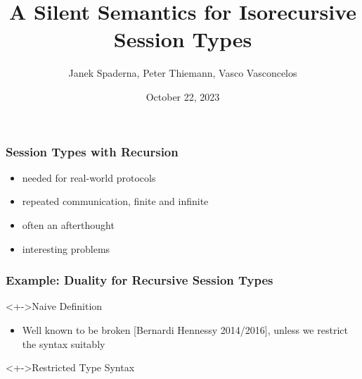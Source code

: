 \documentclass[aspectratio=169]{beamer}
\title{A Silent Semantics for Isorecursive Session Types}
\author{Janek Spaderna, Peter Thiemann, Vasco Vasconcelos}
\institute[]{University of Freiburg, University of Lisbon}
\date{October 22, 2023}
\begin{document}

\begin{frame}
  \titlepage
\end{frame}


\begin{frame}
  \frametitle{Session Types with Recursion}
  \begin{itemize}
  \item needed for real-world protocols
  \item repeated communication, finite and infinite
  \item often an afterthought
  \item interesting problems
  \end{itemize}
\end{frame}

\begin{frame}
  \frametitle{Example: Duality for Recursive Session Types}
  \begin{block}<+->{Naive Definition}
    
  \end{block}
  \begin{itemize}
  \item<+-> Well known to be broken [Bernardi Hennessy 2014/2016],
    unless we restrict the syntax suitably
  \end{itemize}
  \begin{block}<+->{Restricted Type Syntax}
    \footnotesize
    
  \end{block}
\end{frame}
\end{document}
